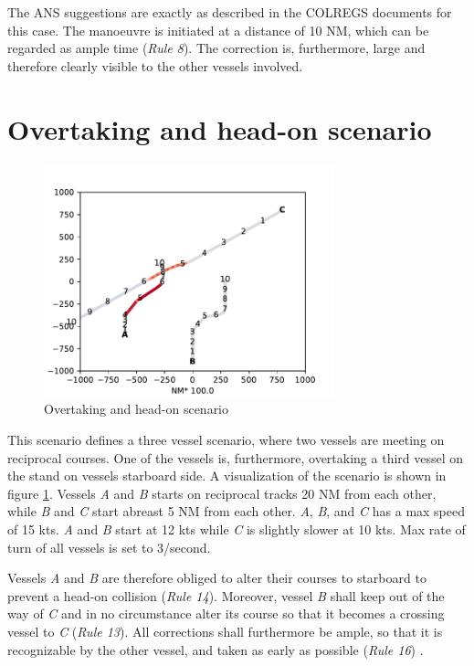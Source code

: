 The ANS suggestions are exactly as described in the COLREGS documents for this case. The manoeuvre is initiated at a distance of 10 NM, which can be regarded as ample time (\textit{Rule 8}). The correction is, furthermore, large and therefore clearly visible to the other vessels involved.

\section{Overtaking and head-on scenario}%


\begin{figure}[H]
    \centering
    \includegraphics[width=0.75\textwidth,height=0.75\textheight,keepaspectratio]{../src/img/overtaking_head_on.png}
    \caption{Overtaking and head-on scenario  \cite{ecolreg_overtaking-and-head-on}}
    \label{fig:overtaking-and-head-on}
\end{figure}
This scenario defines a three vessel scenario, where two vessels are meeting on  reciprocal courses. One of the vessels is, furthermore, overtaking a third vessel on the stand on vessels starboard side. A visualization of the scenario is shown in figure \ref{fig:overtaking-and-head-on}. Vessels \textit{A} and \textit{B} starts on reciprocal tracks 20 NM from each other, while \textit{B} and \textit{C} start abreast 5 NM from each other. \textit{A}, \textit{B}, and \textit{C} has a max speed of 15 kts. \textit{A} and \textit{B} start at 12 kts while \textit{C} is slightly slower at 10 kts. Max rate of turn of all vessels is set to 3\textdegree/second.

Vessels \textit{A} and \textit{B} are therefore obliged to alter their courses to starboard to prevent a head-on collision (\textit{Rule 14}). Moreover, vessel \textit{B} shall keep out of the way of \textit{C}  and in no circumstance alter its course so that it becomes a crossing vessel to \textit{C} (\textit{Rule 13}). All corrections shall furthermore be ample, so that it is recognizable by the other vessel, and taken as early as possible (\textit{Rule 16}) \cite{ecolreg_overtaking-and-head-on}.

